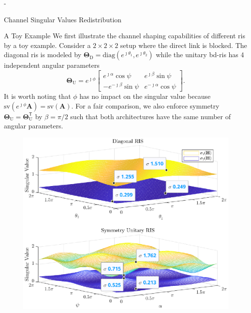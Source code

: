 \begin{section}{-}
	\begin{subsection}{Channel Singular Values Redistribution}
		\begin{subsubsection}{A Toy Example}\label{sc:toy_example}
			We first illustrate the channel shaping capabilities of different \gls{ris} by a toy example.
			Consider a $2 \times 2 \times 2$ setup where the direct link is blocked.
			The diagonal \gls{ris} is modeled by $\mathbf{\Theta}_\mathrm{D} = \mathrm{diag}(e^{\jmath \theta_1}, e^{\jmath \theta_2})$ while the unitary \gls{bd}-\gls{ris} has 4 independent angular parameters
			\begin{equation}
				\mathbf{\Theta}_\mathrm{U} = e^{\jmath \phi} \begin{bmatrix}
					e^{\jmath \alpha} \cos \psi  & e^{\jmath \beta} \sin \psi   \\
					-e^{-\jmath \beta} \sin \psi & e^{-\jmath \alpha} \cos \psi
				\end{bmatrix}.
			\end{equation}
			It is worth noting that $\phi$ has no impact on the singular value because $\mathrm{sv}(e^{\jmath \phi} \mathbf{A}) = \mathrm{sv}(\mathbf{A})$.
			For a fair comparison, we also enforce symmetry $\mathbf{\Theta}_\mathrm{U} = \mathbf{\Theta}_\mathrm{U}^\mathsf{T}$ by $\beta = \pi / 2$ such that both architectures have the same number of angular parameters.
			\begin{figure}
				\centering
				\includegraphics[width=\columnwidth]{assets/chapter_5/singular_trend.eps}

\end{figure}
\end{subsubsection}
\end{subsection}
\end{section}
